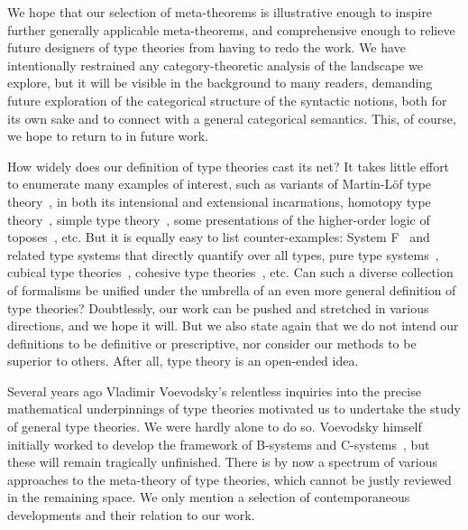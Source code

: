 We hope that our selection of meta-theorems is illustrative enough to inspire further generally applicable meta-theorems, and comprehensive enough to relieve future designers of type theories from having to redo the work.
%
We have intentionally restrained any category-theoretic analysis of the landscape we explore, but it will be visible in the background to many readers, demanding future exploration of the categorical structure of the syntactic notions, both for its own sake and to connect with a general categorical semantics.
%
This, of course, we hope to return to in future work.

How widely does our definition of type theories cast its net? It takes little effort to enumerate many examples of interest, such as variants of Martin-Löf type theory~\citep{martin-lof:introduction}, in both its intensional and extensional incarnations, homotopy type theory~\citep{hott-book}, simple type theory~\citep{church32:_set_postul_found_logic}, some presentations of the higher-order logic of toposes~\citep{lambek-scott-book}, etc. But it is equally easy to list counter-examples: System F~\citep{system-F,Reynolds74} and related type systems that directly quantify over all types, pure type systems~\citep{pure-type-systems}, cubical type theories~\citep{cohen15:_cubic_type_theor}, cohesive type theories~\citep{cohesive-tt}, etc. Can such a diverse collection of formalisms be unified under the umbrella of an even more general definition of type theories? Doubtlessly, our work can be pushed and stretched in various directions, and we hope it will.  But we also state again that we do not intend our definitions to be definitive or prescriptive, nor consider our methods to be superior to others. After all, type theory is an open-ended idea.

\medskip


Several years ago Vladimir Voevodsky's relentless inquiries into the precise mathematical underpinnings of type theories motivated us to undertake the study of general type theories. We were hardly alone to do so. Voevodsky himself initially worked to develop the framework of B-systems and C-systems~\citep{B-systems,C-systems}, but these will remain tragically unfinished. There is by now a spectrum of various approaches to the meta-theory of type theories, which cannot be justly reviewed in the remaining space. We only mention a selection of contemporaneous developments and their relation to our work.


